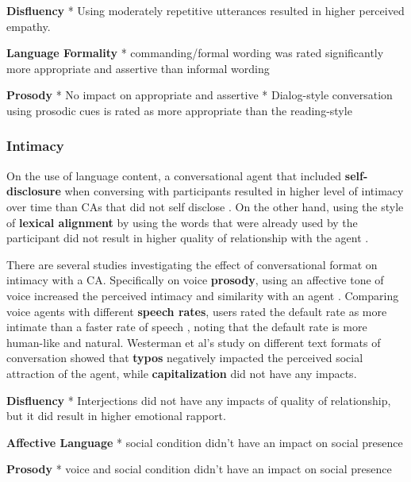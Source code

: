 \textbf{Disfluency}
* Using moderately repetitive utterances resulted in higher perceived empathy. \cite{yang2021effect}\cmt{[72]}

\textbf{Language Formality}
* commanding/formal wording was rated significantly more appropriate and assertive than informal wording \cite{jestin2022effects}\cmt{[81]}

\textbf{Prosody}
* No impact on appropriate and assertive \cite{jestin2022effects}\cmt{[81]}
* Dialog-style conversation using prosodic cues is rated as more appropriate than the reading-style \cite{misu2011toward}\cmt{[83]}

\subsubsection{Intimacy}
On the use of language content, a conversational agent that included \textbf{self-disclosure} when conversing with participants resulted in higher level of intimacy over time than CAs that did not self disclose \cite{lee2020hear}\cmt{[23]}. On the other hand, using the style of \textbf{lexical alignment} by using the words that were already used by the participant did not result in higher quality of relationship with the agent \cite{linnemann2018can}\cmt{[15]}.

There are several studies investigating the effect of conversational format on intimacy with a CA. Specifically on voice \textbf{prosody}, using an affective tone of voice increased the perceived intimacy and similarity with an agent \cite{kim2020can}\cmt{[24]}. Comparing voice agents with different \textbf{speech rates}, users rated the default rate as more intimate than a faster rate of speech \cite{choi2020nobody}\cmt{[54]}, noting that the default rate is more human-like and natural. Westerman et al's study on different text formats of conversation \cite{westerman2019believe}\cmt{[9]} showed that \textbf{typos} negatively impacted the perceived social attraction of the agent, while \textbf{capitalization} did not have any impacts.

\textbf{Disfluency}
* Interjections did not have any impacts of quality of relationship, but it did result in higher emotional rapport. \cite{ceha2022expressive}\cmt{[77]}

\textbf{Affective Language}
* social condition didn't have an impact on social presence \cite{lubold2016effects}\cmt{[86]}

\textbf{Prosody}
* voice and social condition didn't have an impact on social presence \cite{lubold2016effects}\cmt{[86]}

